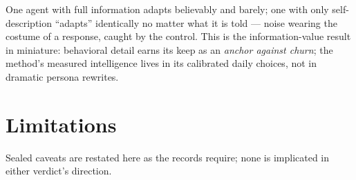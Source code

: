 \documentclass[11pt]{article}
\begin{document}
One agent with full information adapts believably and barely; one with
only self-description ``adapts'' identically no matter what it is told
--- noise wearing the costume of a response, caught by the control.
This is the information-value result in miniature: behavioral detail
earns its keep as an \emph{anchor against churn}; the method's measured
intelligence lives in its calibrated daily choices, not in dramatic
persona rewrites.

\section{Limitations}
\label{sec:limits}

Sealed caveats are restated here as the records require; none is
implicated in either verdict's direction.
\end{document}
